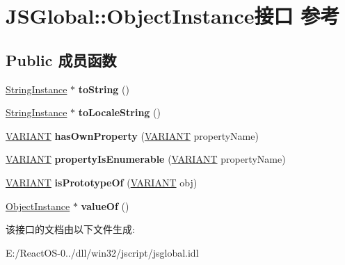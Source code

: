 \hypertarget{interface_j_s_global_1_1_object_instance}{}\section{J\+S\+Global\+:\+:Object\+Instance接口 参考}
\label{interface_j_s_global_1_1_object_instance}
\subsection*{Public 成员函数}
\begin{DoxyCompactItemize}
\item 
\mbox{\label{interface_j_s_global_1_1_object_instance_aa996bebb2d4ed8bd863a687e5c30c508}} 
\hyperlink{interface_j_s_global_1_1_string_instance}{String\+Instance} $\ast$ {\bfseries to\+String} ()
\item 
\mbox{\label{interface_j_s_global_1_1_object_instance_ac4e8d082d2b512824f3c3f0cbe1e4e6c}} 
\hyperlink{interface_j_s_global_1_1_string_instance}{String\+Instance} $\ast$ {\bfseries to\+Locale\+String} ()
\item 
\mbox{\label{interface_j_s_global_1_1_object_instance_a72f48cd529913b928bfe44093c9ffc7b}} 
\hyperlink{structtag_v_a_r_i_a_n_t}{V\+A\+R\+I\+A\+NT} {\bfseries has\+Own\+Property} (\hyperlink{structtag_v_a_r_i_a_n_t}{V\+A\+R\+I\+A\+NT} property\+Name)
\item 
\mbox{\label{interface_j_s_global_1_1_object_instance_ac58790138e1afcb8b663615290701d79}} 
\hyperlink{structtag_v_a_r_i_a_n_t}{V\+A\+R\+I\+A\+NT} {\bfseries property\+Is\+Enumerable} (\hyperlink{structtag_v_a_r_i_a_n_t}{V\+A\+R\+I\+A\+NT} property\+Name)
\item 
\mbox{\label{interface_j_s_global_1_1_object_instance_a60d1d08230155d8c525eaa76b8b69d1b}} 
\hyperlink{structtag_v_a_r_i_a_n_t}{V\+A\+R\+I\+A\+NT} {\bfseries is\+Prototype\+Of} (\hyperlink{structtag_v_a_r_i_a_n_t}{V\+A\+R\+I\+A\+NT} obj)
\item 
\mbox{\label{interface_j_s_global_1_1_object_instance_a1aef57fc3c132309cd98896e91ae7e99}} 
\hyperlink{interface_j_s_global_1_1_object_instance}{Object\+Instance} $\ast$ {\bfseries value\+Of} ()
\end{DoxyCompactItemize}


该接口的文档由以下文件生成\+:\begin{DoxyCompactItemize}
\item 
E\+:/\+React\+O\+S-\/0../dll/win32/jscript/jsglobal.\+idl\end{DoxyCompactItemize}
